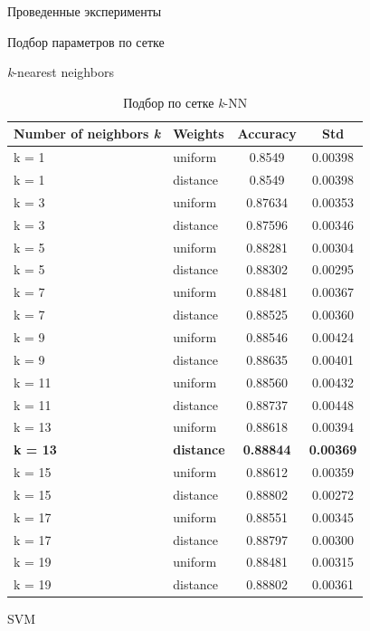 \begin{section}{Проведенные эксперименты}
\begin{subsection}{Подбор параметров по сетке}
\begin{subsubsection}{\textit{k}-nearest neighbors}
  \begin{table}[H]
  \centering
  {\begin{tabular}{|l|l|c|c|}
  \hline
  \textbf{Number of neighbors \textit{k}} & \textbf{Weights} & \textbf{Accuracy} & \textbf{Std} \\
  \hline
  k = 1 & uniform  & 0.8549 & 0.00398 \\
  \hline
  k = 1 & distance  & 0.8549 & 0.00398 \\
  \hline
  k = 3 & uniform  & 0.87634 & 0.00353 \\
  \hline
  k = 3 &  distance & 0.87596  & 0.00346 \\
  \hline
  k = 5 & uniform  & 0.88281 & 0.00304 \\
  \hline
  k = 5 & distance  & 0.88302 & 0.00295 \\
  \hline
  k = 7 & uniform  & 0.88481 & 0.00367 \\
  \hline
  k = 7 &  distance & 0.88525  & 0.00360 \\
  \hline
  k = 9 & uniform  & 0.88546 & 0.00424 \\
  \hline
  k = 9 & distance  & 0.88635 & 0.00401 \\
  \hline
  k = 11 & uniform  & 0.88560 & 0.00432 \\
  \hline
  k = 11 &  distance & 0.88737  & 0.00448 \\
  \hline
  k = 13 & uniform  & 0.88618 &  0.00394 \\
  \hline
  \textbf{k = 13} & \textbf{distance}  & \textbf{0.88844} & \textbf{0.00369} \\
  \hline
  k = 15 & uniform  & 0.88612 & 0.00359 \\
  \hline
  k = 15 &  distance & 0.88802  & 0.00272 \\
  \hline
  k = 17 & uniform  & 0.88551 & 0.00345 \\
  \hline
  k = 17 & distance  & 0.88797 & 0.00300 \\
  \hline
  k = 19 & uniform  & 0.88481 & 0.00315 \\
  \hline
  k = 19 &  distance & 0.88802  & 0.00361 \\
  \hline
  \end{tabular}}

  \caption{Подбор по сетке \textit{k}-NN}
  \label{grid:knn}
  \end{table}



\end{subsubsection}

\begin{subsubsection}{SVM}


\end{subsubsection}
\end{subsection}
\end{section}
